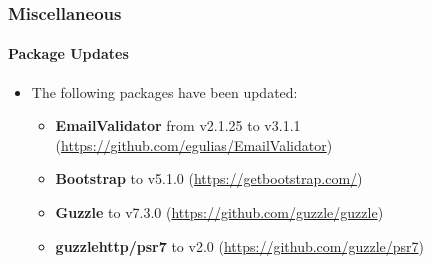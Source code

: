 %

\begin{frame}[fragile]
	\frametitle{Miscellaneous}
	\framesubtitle{Package Updates}


	\begin{itemize}
		\item The following packages have been updated:

			\begin{itemize}
				\item \small\textbf{EmailValidator} from v2.1.25 to v3.1.1\newline
					(\url{https://github.com/egulias/EmailValidator})\normalsize
				\item \small\textbf{Bootstrap} to v5.1.0\newline
					(\url{https://getbootstrap.com/})\normalsize
				\item \small\textbf{Guzzle} to v7.3.0\newline
					(\url{https://github.com/guzzle/guzzle})\normalsize
				\item \small\textbf{guzzlehttp/psr7} to v2.0\newline
					(\url{https://github.com/guzzle/psr7})\normalsize
			\end{itemize}
	\end{itemize}

\end{frame}

